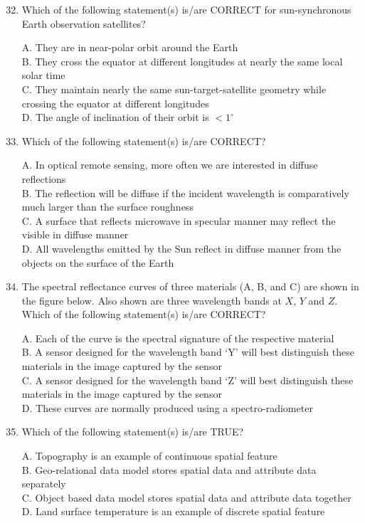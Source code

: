 \documentclass[journal,12pt,onecolumn]{IEEEtran}
\begin{document}
\begin{enumerate}
    \setcounter{enumi}{31}
    \item Which of the following statement(s) is/are CORRECT for sun-synchronous Earth observation satellites?

    A. They are in near-polar orbit around the Earth \\
    B. They cross the equator at different longitudes at nearly the same local solar time \\
    C. They maintain nearly the same sun-target-satellite geometry while crossing the equator at different longitudes \\
    D. The angle of inclination of their orbit is $< 1^\circ$

    \item Which of the following statement(s) is/are CORRECT?

    A. In optical remote sensing, more often we are interested in diffuse reflections \\
    B. The reflection will be diffuse if the incident wavelength is comparatively much larger than the surface roughness \\
    C. A surface that reflects microwave in specular manner may reflect the visible in diffuse manner \\
    D. All wavelengths emitted by the Sun reflect in diffuse manner from the objects on the surface of the Earth

    \item The spectral reflectance curves of three materials (A, B, and C) are shown in the figure below. Also shown are three wavelength bands at $X$, $Y$ and $Z$. Which of the following statement(s) is/are CORRECT?

    A. Each of the curve is the spectral signature of the respective material \\
    B. A sensor designed for the wavelength band ‘Y’ will best distinguish these materials in the image captured by the sensor \\
    C. A sensor designed for the wavelength band ‘Z’ will best distinguish these materials in the image captured by the sensor \\
    D. These curves are normally produced using a spectro-radiometer

    \item Which of the following statement(s) is/are TRUE?

    A. Topography is an example of continuous spatial feature \\
    B. Geo-relational data model stores spatial data and attribute data separately \\
    C. Object based data model stores spatial data and attribute data together \\
    D. Land surface temperature is an example of discrete spatial feature


\end{enumerate}
\end{document}
